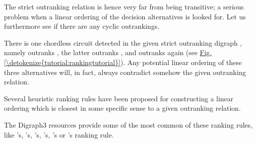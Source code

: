 \documentclass[a4paper,12pt,english]{sphinxhowto}
\begin{document}
\begin{sphinxVerbatim}[commandchars=\\\{\}]
\end{sphinxVerbatim}

The strict outranking relation is hence very far from being transitive; a serious problem when a linear ordering of the decision alternatives is looked for. Let us furthermore see if there are any cyclic outrankings.

\begin{sphinxVerbatim}[commandchars=\\\{\},numbers=left,firstnumber=1,stepnumber=1]
\end{sphinxVerbatim}

There is one chordless circuit detected in the given strict outranking digraph , namely  outranks , the latter outranks , and  outranks again  (see \hyperref[\detokenize{tutorial:rankingtutorial}]{Fig.\@ \ref{\detokenize{tutorial:rankingtutorial}}}). Any potential linear ordering of these three alternatives will, in fact, always contradict somehow the given outranking relation.

Several heuristic ranking rules have been proposed for constructing a linear ordering which is closest in some specific sense to a given outranking relation.

The Digraph3 resources provide some of the most common of these ranking rules, like ’s, ’s, ’s, ’s, ’s or ’s ranking rule.
\end{document}
